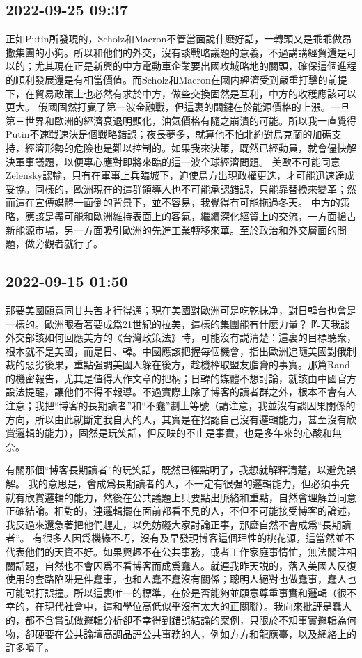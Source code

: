 \documentclass[twocolumn]{ctexart}
\begin{document}
\subsection*{2022-09-25 09:37}

正如Putin所發現的，Scholz和Macron不管當面說什麽好話，一轉頭又是乖乖做昂撒集團的小狗。所以和他們的外交，沒有談戰略議題的意義，不過講講經貿還是可以的；尤其現在正是新興的中方電動車企業要出國攻城略地的關頭，確保這個進程的順利發展還是有相當價值。而Scholz和Macron在國内經濟受到嚴重打擊的前提下，在貿易政策上也必然有求於中方，做些交換固然是互利，中方的收穫應該可以更大。
俄國固然打贏了第一波金融戰，但這裏的關鍵在於能源價格的上漲。一旦第三世界和歐洲的經濟衰退明顯化，油氣價格有隨之崩潰的可能。所以我一直覺得Putin不速戰速決是個戰略錯誤；夜長夢多，就算他不怕北約對烏克蘭的加碼支持，經濟形勢的危險也是難以控制的。如果我來決策，既然已經動員，就會儘快解決軍事議題，以便專心應對即將來臨的這一波全球經濟問題。
美歐不可能同意Zelensky認輸，只有在軍事上兵臨城下，迫使烏方出現政權更迭，才可能迅速達成妥協。同樣的，歐洲現在的這群領導人也不可能承認錯誤，只能靠替換來變革；然而這在宣傳媒體一面倒的背景下，並不容易，我覺得有可能拖過冬天。
中方的策略，應該是盡可能和歐洲維持表面上的客氣，繼續深化經貿上的交流，一方面搶占新能源市場，另一方面吸引歐洲的先進工業轉移來華。至於政治和外交層面的問題，做旁觀者就行了。
\subsection*{2022-09-15 01:50}

那要美國願意同甘共苦才行得通；現在美國對歐洲可是吃乾抹净，對日韓台也會是一樣的。歐洲眼看著要成爲21世紀的拉美，這樣的集團能有什麽力量？
昨天我談外交部該如何回應美方的《台灣政策法》時，可能沒有説清楚：這裏的目標聽衆，根本就不是美國，而是日、韓。中國應該把握每個機會，指出歐洲追隨美國對俄制裁的惡劣後果，重點强調美國人躲在後方，趁機榨取盟友脂膏的事實。那篇Rand的機密報告，尤其是值得大作文章的把柄；日韓的媒體不想討論，就該由中國官方設法提醒，讓他們不得不報導。不過實際上除了博客的讀者群之外，根本不會有人注意；我把“博客的長期讀者”和“不蠢”劃上等號（請注意，我並沒有談因果關係的方向，所以由此就斷定我自大的人，其實是在招認自己沒有邏輯能力，甚至沒有欣賞邏輯的能力），固然是玩笑話，但反映的不止是事實，也是多年來的心酸和無奈。

有關那個“博客長期讀者”的玩笑話，既然已經點明了，我想就解釋清楚，以避免誤解。
我的意思是，會成爲長期讀者的人，不一定有很强的邏輯能力，但必須事先就有欣賞邏輯的能力，然後在公共議題上只要點出脈絡和重點，自然會理解並同意正確結論。相對的，連邏輯擺在面前都看不見的人，不但不可能接受博客的論述，我反過來還急著把他們趕走，以免妨礙大家討論正事，那麽自然不會成爲“長期讀者”。
有很多人因爲機緣不巧，沒有及早發現博客這個理性的桃花源，這當然並不代表他們的天資不好。如果興趣不在公共事務，或者工作家庭事情忙，無法關注相關話題，自然也不會因爲不看博客而成爲蠢人。就連我昨天説的，落入美國人反復使用的套路陷阱是件蠢事，也和人蠢不蠢沒有關係；聰明人絕對也做蠢事，蠢人也可能誤打誤撞。所以這裏唯一的標準，在於是否能夠並願意尊重事實和邏輯（很不幸的，在現代社會中，這和學位高低似乎沒有太大的正關聯）。我向來批評是蠢人的，都不含嘗試做邏輯分析卻不幸得到錯誤結論的案例，只限於不知事實邏輯為何物，卻硬要在公共論壇高調品評公共事務的人，例如方方和龍應臺，以及網絡上的許多噴子。
\end{document}

